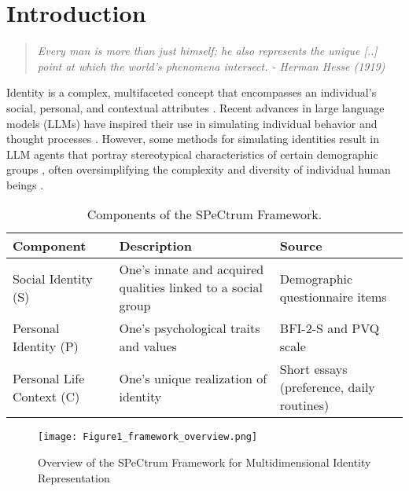 \section{Introduction}
\begin{quote}
\textit{Every man is more than just himself; he also represents the unique [..] point at which the world's phenomena intersect. - Herman Hesse (1919)}
\end{quote}
Identity is a complex, multifaceted concept that encompasses an individual's social, personal, and contextual attributes \citep{hall2015cultural,hesse2013demian, mead1934mind}. Recent advances in large language models (LLMs) have inspired their use in simulating individual behavior and thought processes \citep{park_social_2022, park_generative_2023, kang_values_2023}. However, some methods for simulating identities result in LLM agents that portray stereotypical characteristics of certain demographic groups \citep{argyle_out_2023,gupta_bias_2023, demollm2024}, often oversimplifying the complexity and diversity of individual human beings \citep{cheng_compost_2023, santurkar_whose_2023, petrov_limited_2024, bommasani2022}. 


\begin{table}[t]
\centering
\fontsize{8.5pt}{10pt}\selectfont
\begin{tabular}{>{\raggedright\arraybackslash}m{1.6cm} >{\raggedright\arraybackslash}m{2.8cm} >{\raggedright\arraybackslash}m{2cm}}
\toprule
Component & Description & Source \\ \midrule
Social Identity (S) & One's innate and acquired qualities linked to a social group & 19 Demographic questionnaire items \\ \midrule
Personal Identity (P) & One's psychological traits and values & BFI-2-S and PVQ scale \\ \midrule
Personal Life Context (C) & One's unique realization of identity & Short essays (preference, daily routines) \\ \bottomrule
\end{tabular}
\caption{Components of the SPeCtrum Framework.}
\label{tab:components}
\end{table}

\begin{figure*}[h]
    \centering
    \texttt{[image: Figure1\_framework\_overview.png]}
    \caption{Overview of the SPeCtrum Framework for Multidimensional Identity Representation}
    \label{fig:1}
\end{figure*}


